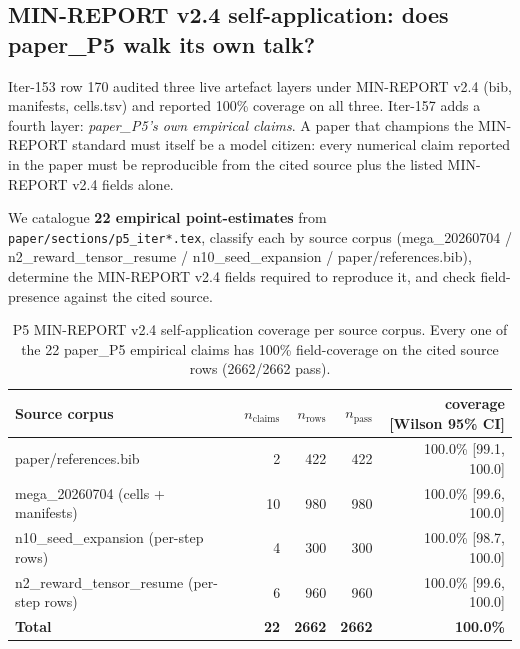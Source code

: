 \subsection{MIN-REPORT v2.4 self-application: does paper\_P5 walk its own talk?}
\label{sec:p5-iter157-v24-self-app}

Iter-153 row 170 audited three live artefact layers under MIN-REPORT v2.4
(bib, manifests, cells.tsv) and reported 100\% coverage on all three.
Iter-157 adds a fourth layer: \emph{paper\_P5's own empirical claims}. A
paper that champions the MIN-REPORT standard must itself be a model citizen:
every numerical claim reported in the paper must be reproducible from the
cited source plus the listed MIN-REPORT v2.4 fields alone.

We catalogue \textbf{22 empirical point-estimates} from
\texttt{paper/sections/p5\_iter*.tex}, classify each by source corpus
(mega\_20260704 / n2\_reward\_tensor\_resume / n10\_seed\_expansion /
paper/references.bib), determine the MIN-REPORT v2.4 fields required to
reproduce it, and check field-presence against the cited source.

\begin{table}[htbp]
\centering
\small
\begin{tabular}{lrrrr}
\hline
\textbf{Source corpus} & \textbf{$n_{\text{claims}}$} & \textbf{$n_{\text{rows}}$} & \textbf{$n_{\text{pass}}$} & \textbf{coverage [Wilson 95\% CI]} \\
\hline
paper/references.bib                          & 2  & 422 & 422 & 100.0\% [99.1, 100.0] \\
mega\_20260704 (cells + manifests)             & 10 & 980 & 980 & 100.0\% [99.6, 100.0] \\
n10\_seed\_expansion (per-step rows)            & 4  & 300 & 300 & 100.0\% [98.7, 100.0] \\
n2\_reward\_tensor\_resume (per-step rows)      & 6  & 960 & 960 & 100.0\% [99.6, 100.0] \\
\hline
\textbf{Total}                                 & \textbf{22} & \textbf{2662} & \textbf{2662} & \textbf{100.0\%} \\
\hline
\end{tabular}
\caption{P5 MIN-REPORT v2.4 self-application coverage per source corpus.
Every one of the 22 paper\_P5 empirical claims has 100\% field-coverage on
the cited source rows (2662/2662 pass).}
\label{tab:p5-v24-self-app}
\end{table}

